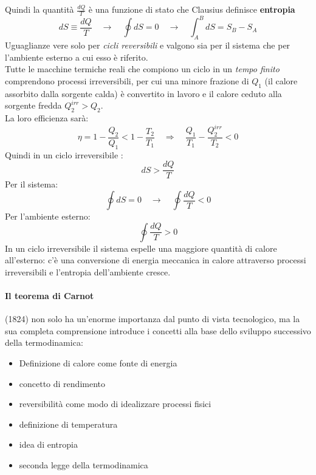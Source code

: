 \documentclass{article}
\newcommand{\so}{\quad \rightarrow \quad}
\newcommand{\So}{\quad \Rightarrow \quad}
\begin{document}
Quindi la quantità $\frac{dQ}{T}$ è una funzione di stato che Clausius definisce \textbf{entropia}
\begin{equation*}
    dS\equiv \frac{dQ}{T} \so \oint dS=0 \so \int_A^BdS=S_B-S_A
\end{equation*}
Uguaglianze vere solo per \textit{cicli reversibili} e valgono sia per il sistema che per l'ambiente esterno a cui esso è riferito.\\
Tutte le macchine termiche reali che compiono un ciclo in un \textit{tempo finito} comprendono processi irreversibili, per cui una minore frazione di $Q_1$ (il calore assorbito dalla sorgente calda) è convertito in lavoro e il calore ceduto alla sorgente fredda $Q_2^{irr}>Q_2$. \\
La loro efficienza sarà:
\begin{equation*}
    \eta=1-\frac{Q_2}{Q_1}<1-\frac{T_2}{T_1} \So \frac{Q_1}{T_1}-\frac{Q_2^{irr}}{T_2}<0
\end{equation*}
Quindi in un ciclo irreversibile :
\begin{equation*}
    dS>\frac{dQ}{T}
\end{equation*}
Per il sistema:
\begin{equation*}
    \oint dS=0 \so \oint \frac{dQ}{T}<0 
\end{equation*}
Per l'ambiente esterno:
\begin{equation*}
    \oint\frac{dQ}{T}>0
\end{equation*}
In un ciclo irreversibile il sistema espelle una maggiore quantità di calore all'esterno: c'è una conversione di energia meccanica in calore attraverso processi irreversibili e l'entropia dell'ambiente cresce.

\paragraph{Il teorema di Carnot} (1824) non solo ha un'enorme importanza dal punto di vista tecnologico, ma la sua completa comprensione introduce i concetti alla base dello sviluppo successivo della termodinamica:
\begin{itemize}
    \item Definizione di calore come fonte di energia
    \item concetto di rendimento 
    \item reversibilità come modo di idealizzare processi fisici
    \item definizione di temperatura
    \item idea di entropia
    \item seconda legge della termodinamica
\end{itemize}
\end{document}
